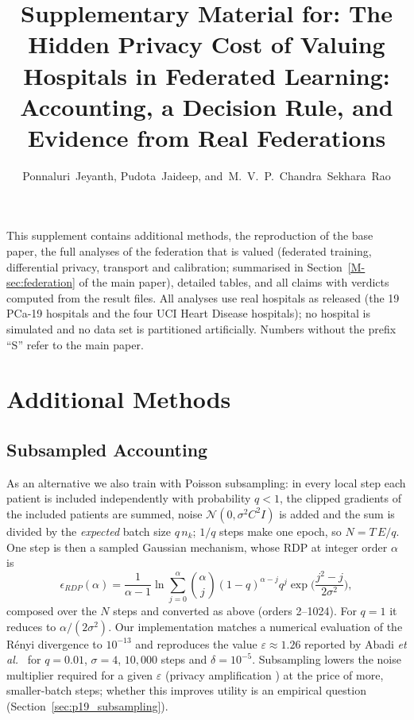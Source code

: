 \documentclass[journal]{IEEEtran}
\begin{document}
\title{Supplementary Material for: The Hidden Privacy Cost of Valuing Hospitals in Federated Learning: Accounting, a Decision Rule, and Evidence from Real Federations}
\author{Ponnaluri~Jeyanth, Pudota~Jaideep, and~M.~V.~P.~Chandra~Sekhara~Rao}
\maketitle

This supplement contains additional methods, the reproduction of the base paper, the full analyses of the federation that is valued (federated training, differential privacy, transport and calibration; summarised in Section~\ref{M-sec:federation} of the main paper), detailed tables, and all claims with verdicts computed from the result files. All analyses use real hospitals as released (the 19 PCa-19 hospitals and the four UCI Heart Disease hospitals); no hospital is simulated and no data set is partitioned artificially. Numbers without the prefix ``S'' refer to the main paper.

\section{Additional Methods}
\label{sec:methods_more}
\subsection{Subsampled Accounting}
As an alternative we also train with Poisson subsampling: in every local step each patient is included independently with probability $q<1$, the clipped gradients of the included patients are summed, noise $\mathcal{N}(0,\sigma^2C^2I)$ is added and the sum is divided by the \emph{expected} batch size $q\,n_k$; $1/q$ steps make one epoch, so $N = T\,E/q$. One step is then a sampled Gaussian mechanism, whose RDP at integer order $\alpha$ is \cite{Mironov2019SampledGaussian, Zhu2019Poisson, Wang2019SubsampledRDP}
\begin{equation}
\epsilon_{RDP}(\alpha) = \frac{1}{\alpha-1}\ln \sum_{j=0}^{\alpha} \binom{\alpha}{j} (1-q)^{\alpha-j} q^{j} \exp\!\Big(\frac{j^2-j}{2\sigma^2}\Big),
\end{equation}
composed over the $N$ steps and converted as above (orders 2--1024). For $q=1$ it reduces to $\alpha/(2\sigma^2)$. Our implementation matches a numerical evaluation of the Rényi divergence to $10^{-13}$ and reproduces the value $\varepsilon \approx 1.26$ reported by Abadi \emph{et al.}\ \cite{Abadi2016DPSGD} for $q=0.01$, $\sigma=4$, $10{,}000$ steps and $\delta=10^{-5}$. Subsampling lowers the noise multiplier required for a given $\varepsilon$ (privacy amplification \cite{Balle2018Amplification}) at the price of more, smaller-batch steps; whether this improves utility is an empirical question (Section~\ref{sec:p19_subsampling}).
\end{document}
